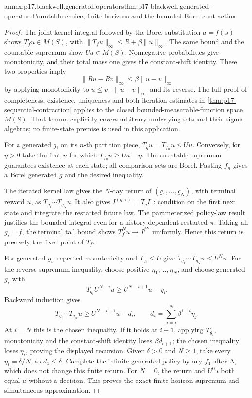 \begin{annexitem}{annex:p17.blackwell.generated.operators}{thm:p17-blackwell-generated-operators}{Countable choice, finite horizons and the bounded Borel contraction}
\begin{proof}
The joint kernel integral followed by the Borel substitution
\(a=f(s)\) shows \(T_fu\in M(S)\), with
\(\|T_fu\|_\infty\leq R+\beta\|u\|_\infty\).
The same bound and the countable supremum show \(Uu\in M(S)\).
Nonnegative probabilities give monotonicity, and their
total mass one gives the constant-shift identity.
These two properties imply
\[
      \|Bu-Bv\|_\infty\leq\beta\|u-v\|_\infty
\]
by applying monotonicity to
\(u\leq v+\|u-v\|_\infty\) and its reverse.
The full proof of completeness, existence, uniqueness and
both iteration estimates in
\cref{thm:p17-sequential-contraction} applies to the
closed bounded-measurable-function space \(M(S)\).
That lemma explicitly covers arbitrary underlying sets and
their sigma algebras; no finite-state premise is used in
this application.

For a generated \(g\), on its \(n\)-th partition piece,
\(T_gu=T_{f_n}u\leq Uu\). Conversely, for \(\eta>0\)
take the first \(n\) for which \(T_{f_n}u\geq Uu-\eta\).
The countable supremum guarantees existence at each state;
all comparison sets are Borel. Pasting \(f_n\) gives a
Borel generated \(g\) and the desired inequality.

The iterated kernel law gives the \(N\)-day return of
\((g_1,\ldots,g_N)\), with terminal reward \(u\), as
\(T_{g_1}\cdots T_{g_N}u\).
It also gives \(I^{(g,\pi)}=T_gI^\pi\): condition on
the first next state and integrate the restarted future
law. The parameterized policy-law result justifies the
bounded integral even for a history-dependent restarted
\(\pi\). Taking all \(g_i=f\), the terminal tail bound
shows \(T_f^Nu\to I^{f^\infty}\) uniformly.
Hence this return is precisely the fixed point of \(T_f\).

For generated \(g_i\), repeated monotonicity and
\(T_{g_i}\leq U\) give
\(T_{g_1}\cdots T_{g_N}u\leq U^Nu\).
For the reverse supremum inequality, choose positive
\(\eta_1,\ldots,\eta_N\), and choose generated \(g_i\) with
\[
 T_{g_i}U^{N-i}u\geq U^{N-i+1}u-\eta_i.
\]
Backward induction gives
\[
 T_{g_i}\cdots T_{g_N}u
   \geq U^{N-i+1}u-d_i,\qquad
 d_i=\sum_{j=i}^N\beta^{j-i}\eta_j.
\]
At \(i=N\) this is the chosen inequality. If it holds at
\(i+1\), applying \(T_{g_i}\), monotonicity and the
constant-shift identity loses \(\beta d_{i+1}\);
the chosen inequality loses \(\eta_i\), proving the
displayed recursion. Given \(\delta>0\) and \(N\geq1\),
take every \(\eta_i=\delta/N\), so \(d_1\leq\delta\).
Complete the infinite generated policy by any \(f_1\)
after \(N\), which does not change this finite return.
For \(N=0\), the return and \(U^0u\) both equal \(u\)
without a decision. This proves the exact finite-horizon
supremum and simultaneous approximation.


\end{proof}
\end{annexitem}
